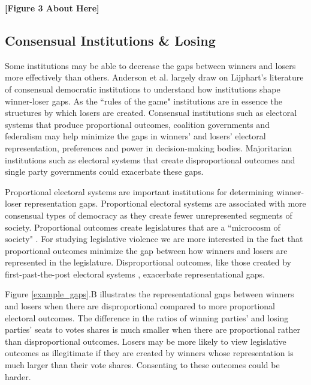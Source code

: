 \documentclass[a4paper]{article}\usepackage{graphicx, color}
\begin{document}
{\begin{center}
    {\bf{[Figure 3 About Here]}}

\end{center}


\subsection{Consensual Institutions \& Losing}

Some institutions may be able to decrease the gaps between winners and losers more effectively than others. Anderson et al. \citeyearpar[Chapter 7]{Anderson2005} largely draw on Lijphart's literature of consensual democratic institutions \citeyearpar{Lijphart1977, Lijphart1984, Lijphart1991, lijphart1999, Lijphart2004} to understand how institutions shape winner-loser gaps. As the ``rules of the game" \citep{North1990} institutions are in essence the structures by which losers are created. Consensual institutions such as electoral systems that produce proportional outcomes, coalition governments and federalism may help  minimize the gaps in winners' and losers' electoral representation, preferences and power in decision-making bodies. Majoritarian institutions such as electoral systems that create disproportional outcomes and single party governments could exacerbate these gaps.

Proportional electoral systems are important institutions for determining winner-loser representation gaps. Proportional electoral systems are associated with more consensual types of democracy \citep{Powell2000} as they create fewer unrepresented segments of society. Proportional outcomes create legislatures that are a ``microcosm of society" \citep{Carey2011}. For studying legislative violence we are more interested in the fact that proportional outcomes minimize the gap between how winners and losers are represented in the legislature. Disproportional outcomes, like those created by first-past-the-post electoral systems \citep[see][]{Duverger1954}, exacerbate representational gaps. 

Figure \ref{example_gaps}.B illustrates the representational gaps between winners and losers when there are disproportional compared to more proportional electoral outcomes.  The difference in the ratios of winning parties' and losing parties' seats to votes shares is much smaller when there are proportional rather than disproportional outcomes. Losers may be more likely to view legislative outcomes as illegitimate if they are created by winners whose representation is much larger than their vote shares. Consenting to these outcomes could be harder.

}
\end{document}

